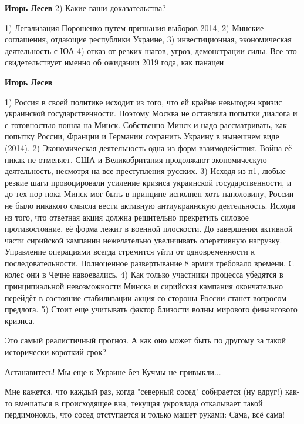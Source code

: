 \begin{itemize}
\begin{itemize}
\textbf{Игорь Лесев} 2) Какие ваши доказательства?

1) Легализация Порошенко путем признания выборов 2014, 2) Минские соглашения, отдающие республики Украине, 3) инвестиционная, экономическая деятельность с ЮА 4) отказ от резких шагов, угроз, демонстрации силы. Все это свидетельствует именно об ожидании 2019 года, как панацеи

\textbf{Игорь Лесев} 

1) Россия в своей политике исходит из того, что ей крайне невыгоден кризис
украинской государственности. Поэтому Москва не оставляла попытки диалога и с
готовностью пошла на Минск. Собственно Минск и надо рассматривать, как попытку
России, Франции и Германии сохранить Украину в нынешнем виде (2014). 2)
Экономическая деятельность одна из форм взаимодействия. Война её никак не
отменяет. США и Великобритания продолжают экономическую деятельность, несмотря
на все преступления русских. 3) Исходя из п1, любые резкие шаги провоцировали
усиление кризиса украинской государственности, и до тех пор пока Минск мог быть
в принципе исполнен хоть наполовину, России не было никакого смысла вести
активную антиукраинскую деятельность. Исходя из того, что ответная акция должна
решительно прекратить силовое противостояние, её форма лежит в военной
плоскости. До завершения активной части сирийской кампании нежелательно
увеличивать оперативную нагрузку. Управление операциями всегда стремится уйти
от одновременности к последовательности. Полноценное развертывание 8 армии
требовало времени. С колес они в Чечне навоевались. 4) Как только участники
процесса убедятся в принципиальной невозможности Минска и сирийская кампания
окончательно перейдёт в состояние стабилизации акция со стороны России станет
вопросом предлога. 5) Стоит еще учитывать фактор близости волны мирового
финансового кризиса.

\end{itemize} %

Это самый реалистичный прогноз. А как оно может быть по другому за такой исторически короткий срок?

Астанавитесь! Мы еще к Украине без Кучмы не привыкли...


Мне кажется, что каждый раз, когда "северный сосед" собирается (ну вдруг!)
как-то вмешаться в происходящее вна, текущая укровлада откалывает такой
пердимонокль, что сосед отступается и только машет руками: Сама, всё сама!


\end{itemize}
